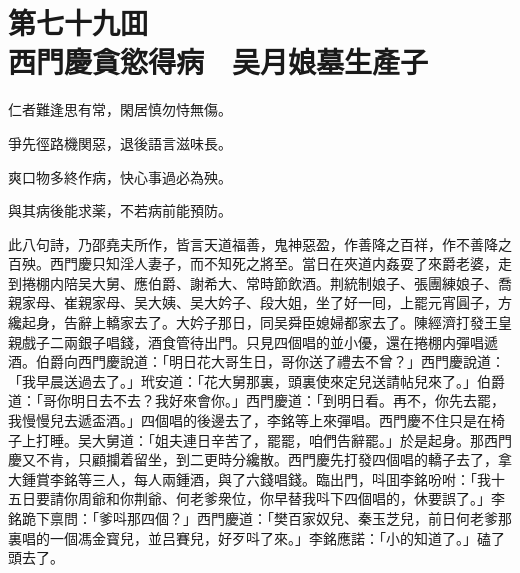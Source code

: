 
\chapter*{第七十九囬　\\西門慶貪慾得病　吴月娘墓生產子}


\begin{myquote}
仁者難逢思有常，閑居慎勿恃無傷。

爭先徑路機関惡，退後語言滋味長。

爽口物多終作病，快心事過必為殃。

與其病後能求薬，不若病前能預防。
\end{myquote}

此八句詩，乃邵堯夫所作，皆言天道福善，鬼神惡盈，作善降之百祥，作不善降之百殃。西門慶只知淫人妻子，而不知死之將至。當日在夾道内姦耍了來爵老婆，走到捲棚内陪吴大舅、應伯爵、謝希大、常時節飲酒。荆統制娘子、張團練娘子、喬親家母、崔親家母、吴大姨、吴大妗子、段大姐，坐了好一囘，上罷元宵圓子，方纔起身，告辭上轎家去了。大妗子那日，同吴舜臣媳婦都家去了。陳經濟打發王皇親戲子二兩銀子唱錢，酒食管待出門。只見四個唱的並小優，還在捲棚内彈唱遞酒。伯爵向西門慶說道：「明日花大哥生日，哥你送了禮去不曾？」西門慶說道：「我早晨送過去了。」玳安道：「花大舅那裏，頭裏使來定兒送請帖兒來了。」伯爵道：「哥你明日去不去？我好來會你。」西門慶道：「到明日看。再不，你先去罷，我慢慢兒去遞盃酒。」四個唱的後邊去了，李銘等上來彈唱。西門慶不住只是在椅子上打睡。吴大舅道：「姐夫連日辛苦了，罷罷，咱們告辭罷。」於是起身。那西門慶又不肯，只顧攔着留坐，到二更時分纔散。西門慶先打發四個唱的轎子去了，拿大鍾賞李銘等三人，每人兩鍾酒，與了六錢唱錢。臨出門，呌囬李銘吩咐：「我十五日要請你周爺和你荆爺、何老爹衆位，你早替我呌下四個唱的，休要誤了。」李銘跪下禀問：「爹呌那四個？」西門慶道：「樊百家奴兒、秦玉芝兒，前日何老爹那裏唱的一個馮金寳兒，並吕賽兒，好歹呌了來。」李銘應諾：「小的知道了。」磕了頭去了。

